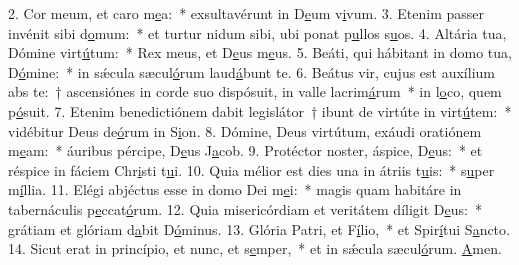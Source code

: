 2. Cor meum, et caro m\uline{e}a:~* exsultavérunt in D\uline{e}um v\uline{i}vum.
3. Etenim passer invénit sibi d\uline{o}mum:~* et turtur nidum sibi, ubi ponat p\uline{u}llos s\uline{u}os.
4. Altária tua, Dómine virt\uline{ú}tum:~* Rex meus, et D\uline{e}us m\uline{e}us.
5. Beáti, qui hábitant in domo tua, D\uline{ó}mine:~* in sǽcula sæcul\uline{ó}rum laud\uline{á}bunt te.
6. Beátus vir, cujus est auxílium abs te:~† ascensiónes in corde suo dispósuit, in valle lacrim\uline{á}rum~* in l\uline{o}co, quem p\uline{ó}suit.
7. Etenim benedictiónem dabit legislátor~† ibunt de virtúte in virt\uline{ú}tem:~* vidébitur Deus de\uline{ó}rum in S\uline{i}on.
8. Dómine, Deus virtútum, exáudi oratiónem m\uline{e}am:~* áuribus pércipe, D\uline{e}us J\uline{a}cob.
9. Protéctor noster, áspice, D\uline{e}us:~* et réspice in fáciem Chr\uline{i}sti t\uline{u}i.
10. Quia mélior est dies una in átriis t\uline{u}is:~* s\uline{u}per m\uline{í}llia.
11. Elégi abjéctus esse in domo Dei m\uline{e}i:~* magis quam habitáre in tabernáculis p\uline{e}ccat\uline{ó}rum.
12. Quia misericórdiam et veritátem díligit D\uline{e}us:~* grátiam et glóriam d\uline{a}bit D\uline{ó}minus.
13. Glória Patri, et F\uline{í}lio,~* et Spir\uline{í}tui S\uline{a}ncto.
14. Sicut erat in princípio, et nunc, et s\uline{e}mper,~* et in sǽcula sæcul\uline{ó}rum. \uline{A}men.
